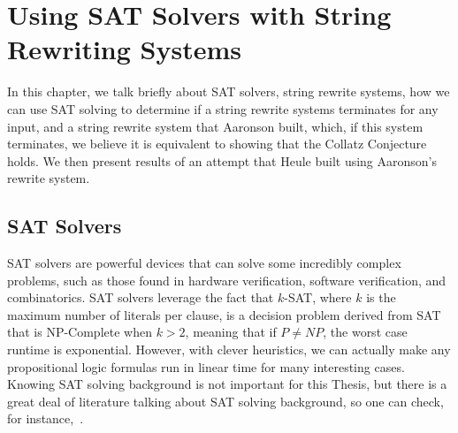 
\chapter{Using SAT Solvers with String Rewriting Systems} \label{sec:SRSandSAT}
In this chapter, we talk briefly about SAT solvers, string rewrite systems, how we can use SAT solving to determine if a string rewrite systems terminates for any input, and a string rewrite system that Aaronson built, which, if this system terminates, we believe it is equivalent to showing that the Collatz Conjecture holds. We then present results of an attempt that Heule built using Aaronson's rewrite system.
\section{SAT Solvers}
SAT solvers are powerful devices that can solve some incredibly complex problems, such as those found in hardware verification, software verification, and combinatorics. SAT solvers leverage the fact that $k$-SAT, where $k$ is the maximum number of literals per clause, is a decision problem derived from SAT that is NP-Complete when $k > 2$, meaning that if $P \ne NP$, the worst case runtime is exponential. However, with clever heuristics, we can actually make any propositional logic formulas run in linear time for many interesting cases. Knowing SAT solving background is not important for this Thesis, but there is a great deal of literature talking about SAT solving background, so one can check, for instance,~\cite{Biere:2009:HSV:1550723}.
